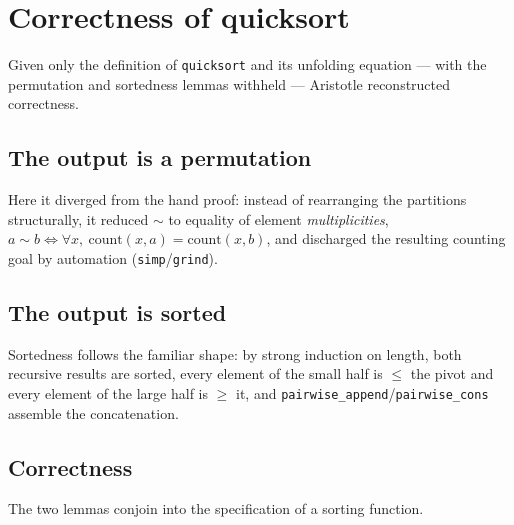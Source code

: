 \documentclass[11pt]{article}
\newcommand{\Perm}{\sim}
\begin{document}
\section{Correctness of quicksort}
Given only the definition of \texttt{quicksort} and its unfolding equation --- with the permutation
and sortedness lemmas withheld --- Aristotle reconstructed correctness.

\subsection{The output is a permutation}
Here it diverged from the hand proof: instead of rearranging the partitions structurally, it reduced
$\Perm$ to equality of element \emph{multiplicities}, $a \Perm b \iff \forall x,\ \mathrm{count}(x,a)
= \mathrm{count}(x,b)$, and discharged the resulting counting goal by automation
(\texttt{simp}/\texttt{grind}).


\subsection{The output is sorted}
Sortedness follows the familiar shape: by strong induction on length, both recursive results are
sorted, every element of the small half is $\leq$ the pivot and every element of the large half is
$\geq$ it, and \texttt{pairwise\_append}/\texttt{pairwise\_cons} assemble the concatenation.


\subsection{Correctness}
The two lemmas conjoin into the specification of a sorting function.

\end{document}
